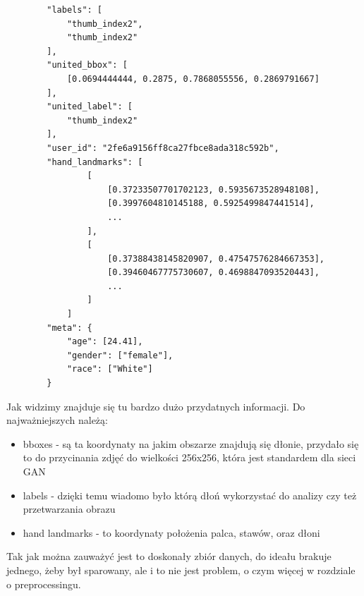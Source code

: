 \documentclass[12pt]{article}
\begin{document}
\begin{sloppypar}
{{\begin{lstlisting}
        "labels": [
            "thumb_index2",
            "thumb_index2"
        ],
        "united_bbox": [
            [0.0694444444, 0.2875, 0.7868055556, 0.2869791667]
        ],
        "united_label": [
            "thumb_index2"
        ],
        "user_id": "2fe6a9156ff8ca27fbce8ada318c592b",
        "hand_landmarks": [
                [
                    [0.37233507701702123, 0.5935673528948108],
                    [0.3997604810145188, 0.5925499847441514],
                    ...
                ],
                [
                    [0.37388438145820907, 0.47547576284667353],
                    [0.39460467775730607, 0.4698847093520443],
                    ...
                ]
            ]
        "meta": {
            "age": [24.41],
            "gender": ["female"],
            "race": ["White"]
        }
    \end{lstlisting}
    Jak widzimy znajduje się tu bardzo dużo przydatnych informacji. Do najważniejszych należą:
    \begin{itemize}
      \item bboxes - są ta koordynaty na jakim obszarze znajdują się dłonie, przydało się to do przycinania zdjęć do wielkości 256x256, która jest standardem dla sieci GAN
      \item labels - dzięki temu wiadomo było którą dłoń wykorzystać do analizy czy też przetwarzania obrazu
      \item hand landmarks - to koordynaty położenia palca, stawów, oraz dłoni
    \end{itemize}
    Tak jak można zauważyć jest to doskonały zbiór danych, do ideału brakuje jednego, żeby był sparowany, ale i to nie jest problem, o czym więcej w rozdziale o preprocessingu. 
  }
}
\end{sloppypar}
\end{document}

